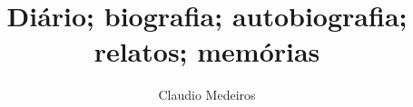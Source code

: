 \documentclass[11pt]{extarticle}
\begin{document}



\newcommand{\AutorLivro}{Claudio Medeiros}
\newcommand{\TituloLivro}{Diário; biografia; autobiografia; relatos; memórias}
\newcommand{\Tema}{Protagonismo juvenis}
\newcommand{\Genero}{Narrativa histórica}
\newcommand{\issnppub}{---}
\newcommand{\issnepub}{---}
\newcommand{\colaborador}{\textbf{Rebeca Martins de Souza}}


\title{\TituloLivro}
\author{\AutorLivro}
\def\authornotes{\colaborador}

\date{}
\maketitle
\end{document}
